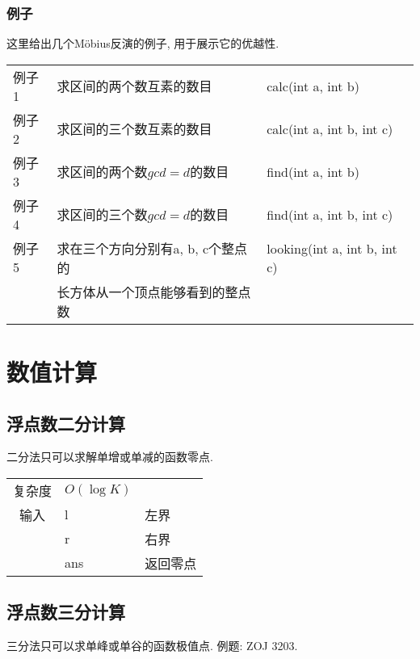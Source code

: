         \subsubsection{例子}\small
这里给出几个M\"{o}bius反演的例子, 用于展示它的优越性.
\begin{longtable}{|l|l|l|}
例子1 & 求区间的两个数互素的数目 & calc(int a, int b) \\
例子2 & 求区间的三个数互素的数目 & calc(int a, int b, int c) \\
例子3 & 求区间的两个数$gcd = d$的数目 & find(int a, int b) \\
例子4 & 求区间的三个数$gcd = d$的数目 & find(int a, int b, int c) \\
例子5 & 求在三个方向分别有a, b, c个整点的 & looking(int a, int b, int c) \\
      & 长方体从一个顶点能够看到的整点数 &  \\
\end{longtable}




\section{数值计算}


    \subsection{浮点数二分计算}\small
二分法只可以求解单增或单减的函数零点.

\begin{longtable}{|c|l|l|}
复杂度 & $O(\log K)$ &  \\
输入 & l & 左界 \\
 & r & 右界 \\
 & ans & 返回零点 \\ 
\end{longtable}



    \subsection{浮点数三分计算}\small
三分法只可以求单峰或单谷的函数极值点. 例题: ZOJ 3203.



